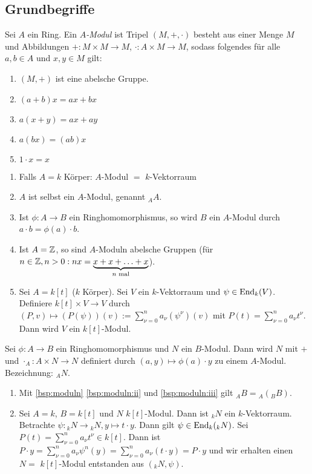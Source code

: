 \documentclass[12pt,a4paper]{scrartcl}
\theoremstyle{cplain}
\theoremstyle{cdef}
\begin{document}
\subsection{Grundbegriffe}
\begin{defi}
    Sei $A$ ein Ring. Ein \emph{$A$-Modul} ist Tripel $(M, +, \cdot)$ besteht aus einer Menge $M$ und Abbildungen $+: M\times M \rightarrow M$, $\cdot: A\times M \rightarrow M$, sodass folgendes für alle $a,b\in A$ und $x,y \in M$ gilt:
    \begin{enumerate}
        \item $(M,+)$ ist eine abelsche Gruppe.
        \item $(a+b)x=ax+bx$
        \item $a(x+y)=ax+ay$
        \item $a(bx)=(ab)x$
        \item $1\cdot x=x$
    \end{enumerate}
\end{defi}
\begin{bsp} \label{bsp:moduln}
    \leavevmode
    \begin{enumerate}
        \item Falls $A=k$ Körper: $A$-Modul $=$ $k$-Vektorraum
        \item $A$ ist selbst ein $A$-Modul, genannt ${}_AA$. \label{bsp:moduln:ii}
        \item Ist $\phi: A\rightarrow B$ ein Ringhomomorphismus, so wird $B$ ein $A$-Modul durch $a\cdot b = \phi(a)\cdot b$. \label{bsp:moduln:iii}
        \item Ist $A=\mathbb Z$, so sind $A$-Moduln abelsche Gruppen (für $n\in \mathbb Z, n>0: nx=\underbrace{x+x+\ldots+x}_{n\text{ mal}}$).
        \item Sei $A=k[t]$ ($k$ Körper). Sei $V$ ein $k$-Vektorraum und $\psi \in \operatorname{End}_k(V)$. Definiere $k[t] \times V \rightarrow V$ durch $(P,v) \mapsto (P(\psi))(v):=\sum_{\nu=0}^n a_\nu(\psi^\nu)(v)$ mit $P(t)=\sum_{\nu=0}^n a_\nu t^\nu$. Dann wird $V$ ein $k[t]$-Modul.
    \end{enumerate}
\end{bsp}
\begin{defi}
    Sei $\phi: A\rightarrow B$ ein Ringhomomorphismus und $N$ ein $B$-Modul. Dann wird $N$ mit $+$ und $\cdot_A: A\times N\rightarrow N$ definiert durch $(a, y) \mapsto \phi(a)\cdot y$ zu einem $A$-Modul. Bezeichnung: ${}_AN$.
\end{defi}
\begin{bsp}
    \leavevmode
    \begin{enumerate}
        \item Mit \cref{bsp:moduln} \ref{bsp:moduln:ii} und \ref{bsp:moduln:iii} gilt ${}_AB={}_A({}_BB)$.
        \item Sei $A=k$, $B=k[t]$ und $N$ $k[t]$-Modul.
        Dann ist ${}_kN$ ein $k$-Vektorraum.
        Betrachte $\psi: {}_kN \to {}_kN, y\mapsto t\cdot y$. Dann gilt $\psi\in \operatorname{End}_k({}_kN)$.
        Sei $P(t)=\sum_{\nu=0}^n a_\nu t^\nu\in k[t]$. Dann ist $P\cdot y = \sum_{\nu = 0}^n a_\nu \psi^n(y) = \sum_{\nu = 0}^n a_\nu (t\cdot y) = P\cdot y$ und wir erhalten einen $N = $ $k[t]$-Modul entstanden aus $({}_kN, \psi)$.
    \end{enumerate}
\end{bsp}
\end{document}
